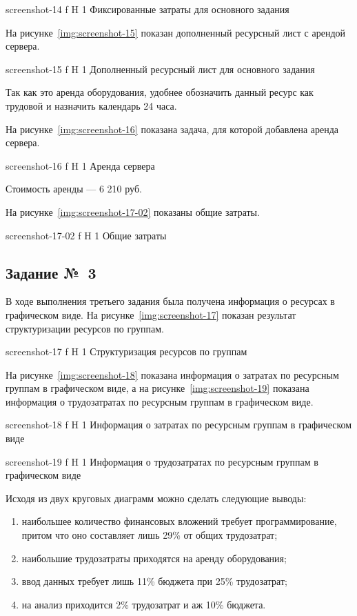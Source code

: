 \documentclass{bmstu}
\begin{document}
    {screenshot-14}
    {f}
    {H}
    {1\textwidth}
    {Фиксированные затраты для основного задания}
    
На рисунке~\ref{img:screenshot-15} показан дополненный ресурсный лист с арендой сервера.
    
    {screenshot-15}
    {f}
    {H}
    {1\textwidth}
    {Дополненный ресурсный лист для основного задания}
    
Так как это аренда оборудования, удобнее обозначить данный ресурс как трудовой и назначить календарь 24 часа.
    
На рисунке~\ref{img:screenshot-16} показана задача, для которой добавлена аренда сервера.
    
    {screenshot-16}
    {f}
    {H}
    {1\textwidth}
    {Аренда сервера}
    
Стоимость аренды --- 6 210 руб.

На рисунке~\ref{img:screenshot-17-02} показаны общие затраты.
    
    {screenshot-17-02}
    {f}
    {H}
    {1\textwidth}
    {Общие затраты}

\subsection{Задание №~3}

В ходе выполнения третьего задания была получена информация о ресурсах в графическом виде. 
На рисунке~\ref{img:screenshot-17} показан результат структуризации ресурсов по группам.
    
    {screenshot-17}
    {f}
    {H}
    {1\textwidth}
    {Структуризация ресурсов по группам}
    
На рисунке~\ref{img:screenshot-18} показана информация о затратах по ресурсным группам в графическом виде, а на рисунке~\ref{img:screenshot-19} показана информация о трудозатратах по ресурсным группам в графическом виде.

    {screenshot-18}
    {f}
    {H}
    {1\textwidth}
    {Информация о затратах по ресурсным группам в графическом виде}

    {screenshot-19}
    {f}
    {H}
    {1\textwidth}
    {Информация о трудозатратах по ресурсным группам в графическом виде}
    
Исходя из двух круговых диаграмм можно сделать следующие выводы:
\begin{enumerate}
\item[1)] наибольшее количество финансовых вложений требует программирование, притом что оно составляет лишь 29\% от общих трудозатрат;
\item[2)] наибольшие трудозатраты приходятся на аренду оборудования;
\item[3)] ввод данных требует лишь 11\% бюджета при 25\% трудозатрат;
\item[4)] на анализ приходится 2\% трудозатрат и аж 10\% бюджета.
\end{enumerate}
\end{document}
